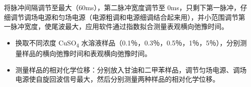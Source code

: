 将脉冲间隔调节至最大（60ms），第二脉冲宽度调节至
0ms，只剩下第一脉冲，仔细调节调场电源和匀场电源（电源粗调和电源细调结合起来用），并小范围调节第一脉冲宽度，使尾波最大，应用软件通过指数拟合测量表观横向弛豫时间。

\begin{itemize}
\item
  换取不同浓度 CuSO\textsubscript{4}
  水溶液样品（0.1％，0.3％，0.5％，1％，5％），分别测量样品的横向弛豫时间和表观横向弛豫时间。
\item
  测量样品的相对化学位移：分别放入甘油和二甲苯样品，调节匀场电源、调场电源使自旋回波信号最大，然后分别测量两种样品的相对化学位移。
\end{itemize}
